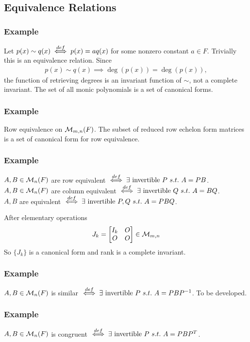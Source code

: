 \documentclass[../main.tex]{subfiles}
\begin{document}
\subsection*{Equivalence Relations}
\subsubsection*{Example}
Let $p(x) \sim q(x) \overset{def}{\iff} p(x) = aq(x)$ for some nonzero constant $a\in F$.
Trivially this is an equivalence relation. Since 
\begin{align*}
    p(x) \sim q(x) \implies \deg(p(x)) = \deg(p(x)),
\end{align*}
the function of retrieving degrees is an invariant function of $\sim$, not a complete 
invariant. The set of all monic polynomials is a set of canonical forms.

\subsubsection*{Example}
Row equivalence on $\mathcal{M}_{m,n}(F)$. The subset of reduced row echelon form matrices is a 
set of canonical form for row equivalence.

\subsubsection*{Example}
$A, B \in \mathcal{M}_n(F)$ are row equivalent $\overset{def}{\iff} \exists \text{ invertible } P~s.t.~ A = PB$.\\
$A, B \in \mathcal{M}_n(F)$ are column equivalent $\overset{def}{\iff} \exists \text{ invertible } Q~s.t.~A=BQ$. \\
$A, B$ are equivalent $\overset{def}{\iff} \exists \text{ invertible }P, Q~s.t.~A = PBQ$.

After elementary operations 
\begin{align*}
    J_k = \begin{bmatrix}
        I_k& O \\
        O& O 
    \end{bmatrix}\in \mathcal{M}_{m,n}
\end{align*}
So $\{J_k\}$ is a canonical form and rank is a complete invariant.

\subsubsection*{Example}
$A, B \in \mathcal{M}_n(F)$ is similar $\overset{def}{\iff} \exists \text{ invertible } P~s.t.~A=PBP^{-1}$.
To be developed.

\subsubsection*{Example}
$A,B \in \mathcal{M}_n(F)$ is congruent $\overset{def}{\iff} \exists \text{ invertible } P~s.t.~A = PBP^T$.
\end{document}

